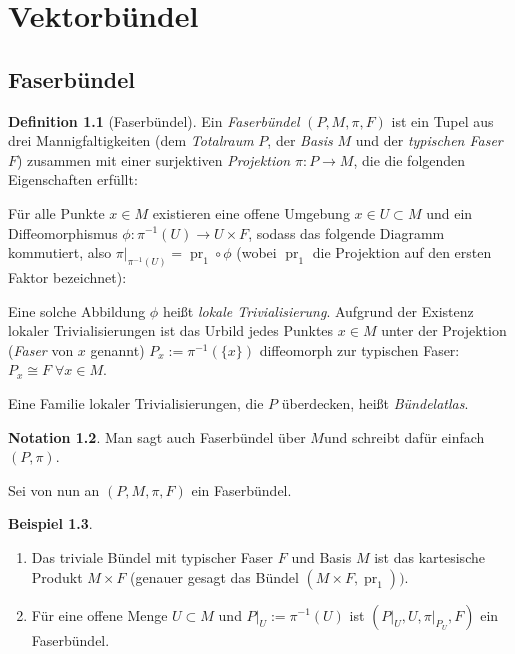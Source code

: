 \documentclass[a4paper]{scrreprt}
\numberwithin{equation}{chapter}
\DeclareMathOperator{\pr}{pr}
\theoremstyle{definition}
\newtheorem{defn}{Definition}[section]
\newtheorem{bsp}[defn]{Beispiel}
\newtheorem{nota}[defn]{Notation}
\begin{document}
\chapter{Vektorbündel}
	\section{Faserbündel}
		\begin{defn}[Faserbündel]
			Ein \emph{Faserbündel} $(P,M,\pi ,F)$ ist ein Tupel aus drei Mannigfaltigkeiten (dem \emph{Totalraum} $P$, der \emph{Basis} $M$ und der \emph{typischen Faser} $F$) zusammen mit einer surjektiven \emph{Projektion} $\pi\colon P\rightarrow M$, die die folgenden Eigenschaften erfüllt:

				Für alle Punkte $x\in M$ existieren eine offene Umgebung $x\in U\subset M$ und ein Diffeomorphismus $\phi\colon \pi^{-1}(U)\rightarrow U\times F$, sodass das folgende Diagramm kommutiert, also $\pi\vert_{\pi^{-1}(U)}=\pr_1\circ\phi$ (wobei $\pr_1$ die Projektion auf den ersten Faktor bezeichnet):
			\begin{center}
			\end{center}
			Eine solche Abbildung $\phi$ heißt \emph{lokale Trivialisierung}. Aufgrund der Existenz lokaler Trivialisierungen ist das Urbild jedes Punktes $x\in M$ unter der Projektion (\emph{Faser} von $x$ genannt) $P_x:=\pi^{-1}(\lbrace x\rbrace )$ diffeomorph zur typischen Faser: $P_x\cong F \; \forall x\in M$.

			Eine Familie lokaler Trivialisierungen, die $P$ überdecken, heißt \emph{Bündelatlas}.
		\end{defn}
		\begin{nota}
			Man sagt auch \glqq Faserbündel über $M$\grqq und schreibt dafür einfach $(P,\pi)$.
		\end{nota}
		Sei von nun an $(P,M,\pi ,F)$ ein Faserbündel.
		\begin{bsp}\hfill
			\begin{enumerate}
				\item Das triviale Bündel mit typischer Faser $F$ und Basis $M$ ist das kartesische Produkt $M\times F$ (genauer gesagt das Bündel $(M\times F,\pr_1))$.
				\item Für eine offene Menge $U\subset M$ und $P\vert_U:=\pi^{-1}(U)$ ist $(P\vert_U,U,\pi\vert_{P_U},F)$ ein Faserbündel.
			\end{enumerate}
		\end{bsp}
\end{document}

